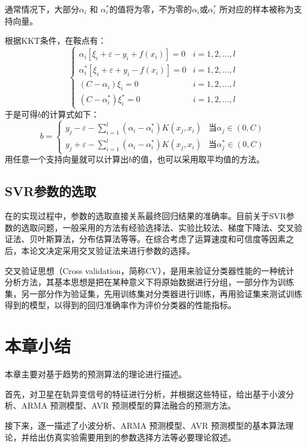 通常情况下，大部分$ \alpha_i$ 和 $ \alpha_i^*$的值将为零，不为零的$ \alpha_i$或$ \alpha_i^*$ 所对应的样本被称为支持向量。

根据KKT条件，在鞍点有：
$$
\left\lbrace 
	\begin{array}{ll}
	\alpha_i[\xi_i+\varepsilon -y_i +f(x_i)] = 0 & i=1,2,\dots,l \\
	\alpha_i^*[\xi_i+\varepsilon + y_i -f(x_i)] = 0 & i=1,2,\dots,l \\
	(C-\alpha_i)\xi_i = 0& i=1,2,\dots,l \\
	(C-\alpha_i^*)\xi_i^* = 0 & i=1,2,\dots,l 
	\end{array}
\right. 
$$
于是可得$b$的计算式如下：
\begin{equation}
	b = \left\lbrace 
		\begin{array}{ll}
		y_j-\varepsilon-\sum_{i=1}^{l}(\alpha_i-\alpha_i^*)K(x_j,x_i)& \text{当}\alpha_j \in (0,C)\\
		y_j+\varepsilon-\sum_{i=1}^{l}(\alpha_i-\alpha_i^*)K(x_j,x_i)& \text{当}\alpha_j^* \in (0,C)
		\end{array}
	\right. 
\end{equation}
用任意一个支持向量就可以计算出$b$的值，也可以采用取平均值的方法。

\subsection{SVR参数的选取}
在的实现过程中，参数的选取直接关系最终回归结果的准确率。目前关于SVR参数的选取问题，一般采用的方法有经验选择法、实验比较法、梯度下降法、交叉验证法、贝叶斯算法，分布估算法等等。在综合考虑了运算速度和可信度等因素之后，本论文决定采用交叉验证法来进行参数的选择。

交叉验证思想（Cross  validation，简称CV），是用来验证分类器性能的一种统计分析方法，其基本思想是把在某种意义下将原始数据进行分组，一部分作为训练集，另一部分作为验证集，先用训练集对分类器进行训练，再用验证集来测试训练得到的模型，以得到的回归准确率作为评价分类器的性能指标。

\section{本章小结}
本章主要对基于趋势的预测算法的理论进行描述。

首先，对卫星在轨异变信号的特征进行分析，并根据这些特征，给出基于小波分析、ARMA 预测模型、AVR 预测模型的算法融合的预测方法。

接下来，逐一描述了小波分析、ARMA 预测模型、AVR 预测模型的基本算法理论，并给出仿真实验需要用到的参数选择方法等必要理论叙述。
